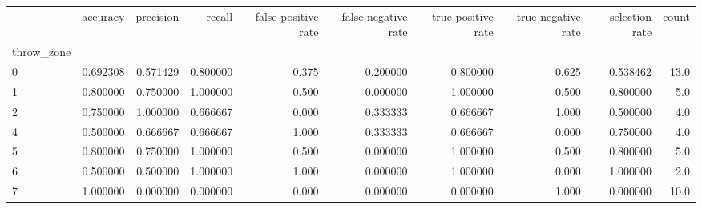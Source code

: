 \begin{tabular}{lrrrrrrrrr}
\toprule
{} &  accuracy &  precision &    recall &  false positive rate &  false negative rate &  true positive rate &  true negative rate &  selection rate &  count \\
throw\_zone &           &            &           &                      &                      &                     &                     &                 &        \\
\midrule
0          &  0.692308 &   0.571429 &  0.800000 &                0.375 &             0.200000 &            0.800000 &               0.625 &        0.538462 &   13.0 \\
1          &  0.800000 &   0.750000 &  1.000000 &                0.500 &             0.000000 &            1.000000 &               0.500 &        0.800000 &    5.0 \\
2          &  0.750000 &   1.000000 &  0.666667 &                0.000 &             0.333333 &            0.666667 &               1.000 &        0.500000 &    4.0 \\
4          &  0.500000 &   0.666667 &  0.666667 &                1.000 &             0.333333 &            0.666667 &               0.000 &        0.750000 &    4.0 \\
5          &  0.800000 &   0.750000 &  1.000000 &                0.500 &             0.000000 &            1.000000 &               0.500 &        0.800000 &    5.0 \\
6          &  0.500000 &   0.500000 &  1.000000 &                1.000 &             0.000000 &            1.000000 &               0.000 &        1.000000 &    2.0 \\
7          &  1.000000 &   0.000000 &  0.000000 &                0.000 &             0.000000 &            0.000000 &               1.000 &        0.000000 &   10.0 \\
\bottomrule
\end{tabular}
